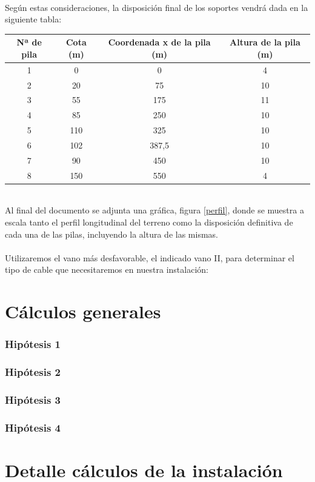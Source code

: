 \documentclass[a4paper,11pt]{article}
\begin{document}
\\
Según estas consideraciones, la disposición final de los soportes vendrá dada en la siguiente tabla:\\
\begin{table}[htbp] \centering
\begin{tabular}{|c|c|c|c|}
\hline
Nª de pila & Cota (m) & Coordenada x de la pila (m) & Altura de la pila (m)\\
\hline
1 & 0 & 0 & 4\\
\hline
2 & 20 & 75 & 10\\
\hline
3 & 55 & 175 & 11\\
\hline
4 & 85 & 250 & 10\\
\hline
5 & 110 & 325 & 10\\
\hline
6 & 102 & 387,5 & 10\\
\hline
7 & 90 & 450 & 10\\
\hline
8 & 150 & 550 & 4\\
\hline
\end{tabular}
\end{table}
\\
Al final del documento se adjunta una gráfica, figura \ref{perfil}, donde se muestra a escala tanto el perfil longitudinal del terreno como la disposición definitiva de cada una de las pilas, incluyendo la altura de las mismas.\\
\\
Utilizaremos el vano más desfavorable, el indicado vano II, para determinar el tipo de cable que necesitaremos en nuestra instalación:\\
\part{Cálculos generales}
\section{Hipótesis 1}
\section{Hipótesis 2}
\section{Hipótesis 3}
\section{Hipótesis 4}
\part{Detalle cálculos de la instalación}
\end{document}
